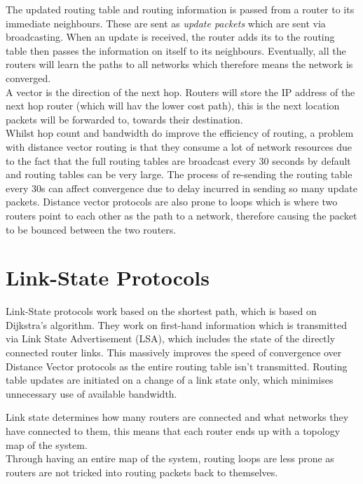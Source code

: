 The updated routing table and routing information is passed from a router to its immediate neighbours. These are sent as \textit{update packets} which are sent via broadcasting. When an update is received, the router adds its to the routing table then passes the information on itself to its neighbours. Eventually, all the routers will learn the paths to all networks which therefore means the network is converged.\\

A vector is the direction of the next hop. Routers will store the IP address of the next hop router (which will hav the lower cost path), this is the next location packets will be forwarded to, towards their destination.\\

Whilst hop count and bandwidth do improve the efficiency of routing, a problem with distance vector routing is that they consume a lot of network resources due to the fact that the full routing tables are broadcast every 30 seconds by default and routing tables can be very large. The process of re-sending the routing table every 30s can affect convergence due to delay incurred in sending so many update packets. Distance vector protocols are also prone to loops which is where two routers point to each other as the path to a network, therefore causing the packet to be bounced between the two routers.

\section{Link-State Protocols}
Link-State protocols work based on the shortest path, which is based on Dijkstra's algorithm. They work on first-hand information which is transmitted via Link State Advertisement (LSA), which includes the state of the directly connected router links. This massively improves the speed of convergence over Distance Vector protocols as the entire routing table isn't transmitted. Routing table updates are initiated on a change of a link state only, which minimises unnecessary use of available bandwidth. 

Link state determines how many routers are connected and what networks they have connected to them, this means that each router ends up with a topology map of the system.\\

Through having an entire map of the system, routing loops are less prone as routers are not tricked into routing packets back to themselves.\\

